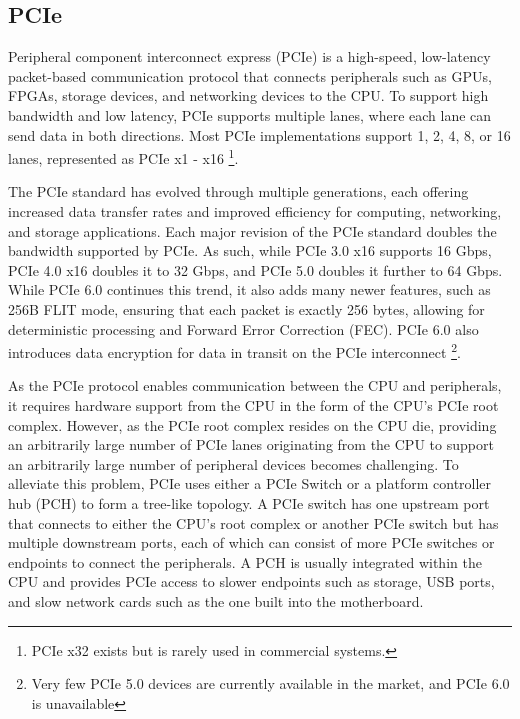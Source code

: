 \subsection{PCIe}
\label{subsec:interconnect-sc-background-pcie}

Peripheral component interconnect express (PCIe) is a high-speed, low-latency packet-based communication protocol that connects peripherals such as GPUs, FPGAs, storage devices, and networking devices to the CPU. 
To support high bandwidth and low latency, PCIe supports multiple lanes, where each lane can send data in both directions.
Most PCIe implementations support 1, 2, 4, 8, or 16 lanes, represented as PCIe x1 - x16
\footnote{PCIe x32 exists but is rarely used in commercial systems.}.

The PCIe standard has evolved through multiple generations, each offering increased data transfer rates and improved efficiency for computing, networking, and storage applications.
Each major revision of the PCIe standard doubles the bandwidth supported by PCIe.
As such, while PCIe 3.0 x16 supports 16 Gbps, PCIe 4.0 x16 doubles it to 32 Gbps, and PCIe 5.0 doubles it further to 64 Gbps.
While PCIe 6.0 continues this trend, it also adds many newer features, such as 256B FLIT mode, ensuring that each packet is exactly 256 bytes, allowing for deterministic processing and Forward Error Correction (FEC).
PCIe 6.0 also introduces data encryption for data in transit on the PCIe interconnect
\footnote{Very few PCIe 5.0 devices are currently available in the market, and PCIe 6.0 is unavailable}.

As the PCIe protocol enables communication between the CPU and peripherals, it requires hardware support from the CPU in the form of the CPU's PCIe root complex.
However, as the PCIe root complex resides on the CPU die, providing an arbitrarily large number of PCIe lanes originating from the CPU to support an arbitrarily large number of peripheral devices becomes challenging.
To alleviate this problem, PCIe uses either a PCIe Switch or a platform controller hub (PCH) to form a tree-like topology.
A PCIe switch has one upstream port that connects to either the CPU's root complex or another PCIe switch but has multiple downstream ports, each of which can consist of more PCIe switches or endpoints to connect the peripherals.
A PCH is usually integrated within the CPU and provides PCIe access to slower endpoints such as storage, USB ports, and slow network cards such as the one built into the motherboard.

